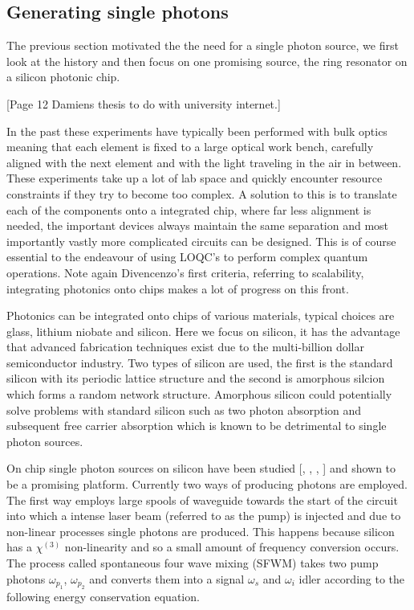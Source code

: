 \subsection{Generating single photons}
The previous section motivated the the need for a single photon source, we first look at the history and then focus on one promising source, the ring resonator on a silicon photonic chip.

[Page 12 Damiens thesis to do with university internet.]

In the past these experiments have typically been performed with bulk optics meaning that each element is fixed to a large optical work bench, carefully aligned with the next element and with the light traveling in the air in between. These experiments take up a lot of lab space and quickly encounter resource constraints if they try to become too complex. A solution to this is to translate each of the components onto a integrated chip, where far less alignment is needed, the important devices always maintain the same separation and most importantly vastly more complicated circuits can be designed. This is of course essential to the endeavour of using LOQC's to perform complex quantum operations. Note again Divencenzo's first criteria, referring to scalability, integrating photonics onto chips makes a lot of progress on this front.

Photonics can be integrated onto chips of various materials, typical choices are glass, lithium niobate and silicon. Here we focus on silicon, it has the advantage that advanced fabrication techniques exist due to the multi-billion dollar semiconductor industry. Two types of silicon are used, the first is the standard silicon with its periodic lattice structure and the second is amorphous silcion which forms a random network structure. Amorphous silicon could potentially solve problems with standard silicon such as two photon absorption and subsequent free carrier absorption which is known to be detrimental to single photon sources.

On chip single photon sources on silicon have been studied [, , , ] and shown to be a promising platform. Currently two ways of producing photons are employed. The first way employs large spools of waveguide towards the start of the circuit into which a intense laser beam (referred to as the pump) is injected and due to non-linear processes single photons are produced. This happens because silicon has a $\chi^{(3)}$ non-linearity and so a small amount of frequency conversion occurs. The process called spontaneous four wave mixing (SFWM) takes two pump photons $\omega_{p_1}$, $\omega_{p_2}$ and converts them into a signal $\omega_s$ and  $\omega_i$ idler according to the following energy conservation equation.

